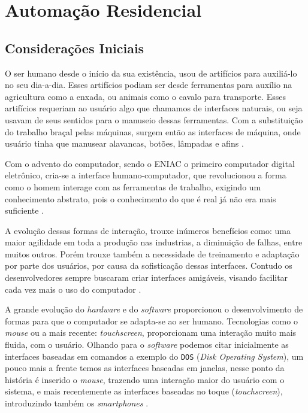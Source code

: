 \chapter {Automação Residencial}
\label{cap:1}

\section {Considerações Iniciais}
O ser humano desde o início da sua existência, usou de artifícios para auxiliá-lo no seu dia-a-dia. Esses
artifícios podiam ser desde ferramentas para auxílio na agricultura como a enxada, ou animais como o cavalo
para transporte. Esses artifícios requeriam ao usuário algo que chamamos de interfaces naturais, ou seja
usavam de seus sentidos para o manuseio dessas ferramentas. Com a substituição do trabalho braçal pelas
máquinas, surgem então as interfaces de máquina, onde usuário tinha que manusear alavancas, botões, lâmpadas e
afins \cite{kirner2007}.

Com o advento do computador, sendo o ENIAC o primeiro computador digital eletrônico, cria-se a interface
humano-computador, que revolucionou a forma como o homem interage com as ferramentas de trabalho, exigindo um
conhecimento abstrato, pois o conhecimento do que é real já não era mais suficiente \cite{eniac,kirner2007}.

A evolução dessas formas de interação, trouxe inúmeros benefícios como: uma maior agilidade em toda a produção
nas industrias, a diminuição de falhas, entre muitos outros. Porém trouxe também a necessidade de treinamento
e adaptação por parte dos usuários, por causa da sofisticação dessas interfaces. Contudo os desenvolvedores
sempre buscaram criar interfaces amigáveis, visando facilitar cada vez mais o uso do computador
\cite{kirner2007}.

A grande evolução do \textit{hardware} e do \textit{software} proporcionou o desenvolvimento de formas para
que o computador se adapta-se ao ser humano. Tecnologias como o \textit{mouse} ou a mais recente:
\textit{touchscreen}, proporcionam uma interação muito mais fluida, com o usuário. Olhando para o
\textit{software} podemos citar inicialmente as interfaces baseadas em comandos a exemplo do \verb'DOS'
(\textit{Disk Operating System}), um pouco mais a frente temos as interfaces baseadas em janelas, nesse ponto
da história é inserido o \textit{mouse}, trazendo uma interação maior do usuário com o sistema, e mais
recentemente as interfaces baseadas no toque (\textit{touchscreen}), introduzindo também os
\textit{smartphones} \cite{kirner2007}.

